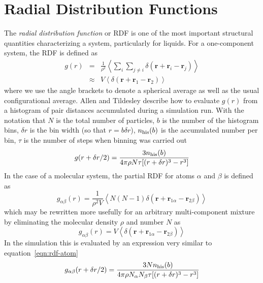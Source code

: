 \documentclass[a4paper,twoside]{report}
\providecommand{\bm}[1]{\mathbf{#1}}
\begin{document}
\section{Radial Distribution Functions}%
\label{sec:rdf}
The \emph{radial distribution function} or RDF is one of the most
important structural quantities characterizing a system, particularly
for liquids.  For a one-component system, the RDF is defined
as\cite[p445]{hansen:86}
\begin{eqnarray}
g(r) & = & \frac{1}{\rho^2} \left < \sum_i \sum_{j\neq i}
\delta(\bm{r} + \bm{r}_i - \bm{r}_j) \right > \\ \nonumber
 &  \approx  & V \left < \delta(\bm{r} + \bm{r}_1 - \bm{r}_2) \right >
\end{eqnarray}
where we use the angle brackets to denote a spherical average as well
as the usual configurational average.  Allen and
Tildesley\cite[pp184,185]{allen:87} describe how to evaluate $g(r)$
from a histogram of pair distances accumulated during a simulation
run. With the notation that $N$ is the total number of particles, $b$
is the number of the histogram bins, $\delta r$ is the bin width (so
that $r = b \delta r$), $n_{\textnormal{his}}(b)$ is the accumulated
number per bin, $\tau$ is the number of steps when binning was carried
out
\begin{equation}
\label{eqn:rdf-atom}
g(r + \delta r/2) = \frac{3 n_{\textnormal{his}}(b)}{4 \pi \rho N \tau
  [(r + \delta r)^3 - r^3]} 
\end{equation}
In the case of a molecular system, the partial RDF for atoms
$\alpha$ and $\beta$ is defined as\cite[p 445]{hansen:86}
\begin{equation}
g_{\alpha \beta}(r) = \frac{1}{\rho^2 V} \left < N(N-1)\delta(\bm{r} +
  \bm{r}_{1\alpha} - \bm{r}_{2\beta}) \right > 
\end{equation}
which may be rewritten more usefully for an arbitrary multi-component
mixture by eliminating the molecular density $\rho$ and number $N$ as
\begin{equation}
g_{\alpha \beta}(r) = V \left < \delta(\bm{r} +  \bm{r}_{1\alpha} -
  \bm{r}_{2\beta}) \right > 
\end{equation}
In the simulation this is evaluated by an expression very similar to
equation~\ref{eqn:rdf-atom}
\begin{equation}
\label{eqn:rdf-site}
g_{\alpha \beta}(r + \delta r/2) = \frac{3 N n_{\textnormal{his}}(b)}{4 \pi
\rho N_\alpha N_\beta \tau [(r + \delta r)^3 - r^3]}
\end{equation}
\end{document}
